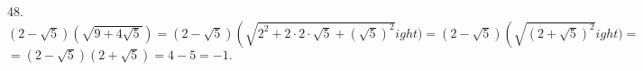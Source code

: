 48. $(2-\sqrt{5})(\sqrt{9+4\sqrt{5}})=(2-\sqrt{5})\left(\sqrt{2^2+2\cdot2\cdot\sqrt{5}+(\sqrt{5})^2}
ight)=(2-\sqrt{5})\left(\sqrt{(2+\sqrt{5})^2}
ight)=$\\$=
(2-\sqrt{5})(2+\sqrt{5})=4-5=-1.$\\
